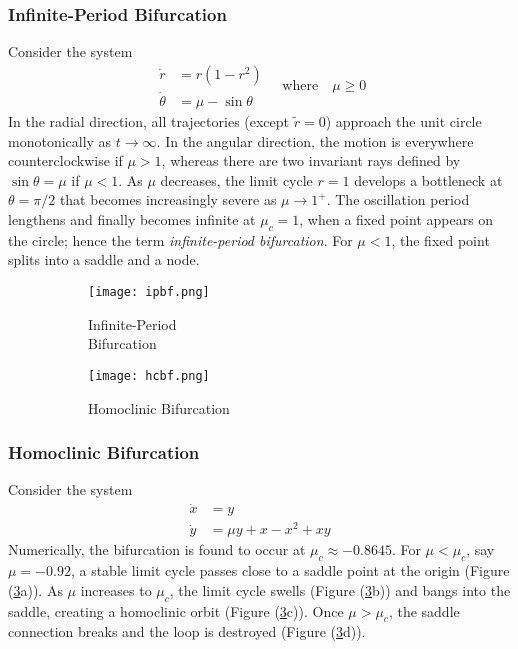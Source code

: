 \subsubsection{Infinite-Period Bifurcation}
Consider the system
\begin{equation}
	\begin{aligned}
		\dot{r}&=r(1-r^2)\\
		\dot{\theta}&=\mu-\sin\theta
	\end{aligned}
	\quad\text{where}\quad\mu\geq0
\end{equation}
In the radial direction, all trajectories (except $\tilde{r}=0$) approach the unit circle monotonically as $t\rightarrow\infty$.
In the angular direction, the motion is everywhere counterclockwise if $\mu>1$, whereas there are two invariant rays defined by $\sin\theta=\mu$ if $\mu<1$. As $\mu$ decreases, the limit cycle $r=1$ develops a bottleneck at $\theta=\pi/2$ that becomes increasingly severe as $\mu\rightarrow1^+$.
The oscillation period lengthens and finally becomes infinite at $\mu_c=1$, when a fixed point appears on the circle; hence the term \emph{infinite-period bifurcation}.
For $\mu<1$, the fixed point splits into a saddle and a node.
\begin{figure}[h!]
	\centering
	\begin{subfigure}{0.27\linewidth}
		\centering
		\texttt{[image: ipbf.png]}
		\caption{Infinite-Period\\Bifurcation}
		\label{fig:ipbf}
	\end{subfigure}
	\vline
	\begin{subfigure}{0.7\linewidth}
		\centering
		\texttt{[image: hcbf.png]}
		\caption{Homoclinic Bifurcation}
		\label{fig:hcbf}
	\end{subfigure}
	\caption{}
\end{figure}
\subsubsection{Homoclinic Bifurcation}
Consider the system
\begin{equation}
	\begin{aligned}
		\dot{x}&=y\\
		\dot{y}&=\mu y+x-x^2+xy
	\end{aligned}
\end{equation}
Numerically, the bifurcation is found to occur at $\mu_c\approx-0.8645$. For $\mu<\mu_c$, say $\mu=-0.92$, a stable limit cycle passes close to a saddle point at the origin (Figure (\ref{fig:hcbf}a)).
As $\mu$ increases to $\mu_c$, the limit cycle swells (Figure (\ref{fig:hcbf}b)) and bangs into the saddle, creating a homoclinic orbit (Figure (\ref{fig:hcbf}c)).
Once $\mu>\mu_c$, the saddle connection breaks and the loop is destroyed (Figure (\ref{fig:hcbf}d)).
